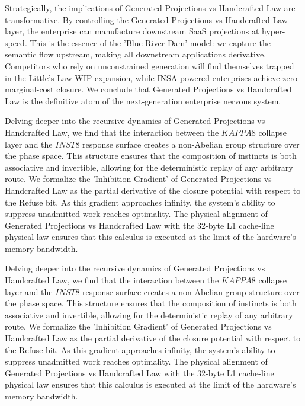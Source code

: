 \documentclass[12pt,a4paper,oneside]{book}
\begin{document}
Strategically, the implications of Generated Projections vs Handcrafted Law are transformative. By controlling the Generated Projections vs Handcrafted Law layer, the enterprise can manufacture downstream SaaS projections at hyper-speed. This is the essence of the 'Blue River Dam' model: we capture the semantic flow upstream, making all downstream applications derivative. Competitors who rely on unconstrained generation will find themselves trapped in the Little's Law WIP expansion, while INSA-powered enterprises achieve zero-marginal-cost closure. We conclude that Generated Projections vs Handcrafted Law is the definitive atom of the next-generation enterprise nervous system. 

Delving deeper into the recursive dynamics of Generated Projections vs Handcrafted Law, we find that the interaction between the $KAPPA8$ collapse layer and the $INST8$ response surface creates a non-Abelian group structure over the phase space. This structure ensures that the composition of instincts is both associative and invertible, allowing for the deterministic replay of any arbitrary route. We formalize the 'Inhibition Gradient' of Generated Projections vs Handcrafted Law as the partial derivative of the closure potential with respect to the Refuse bit. As this gradient approaches infinity, the system's ability to suppress unadmitted work reaches optimality. The physical alignment of Generated Projections vs Handcrafted Law with the 32-byte L1 cache-line physical law ensures that this calculus is executed at the limit of the hardware's memory bandwidth. 

Delving deeper into the recursive dynamics of Generated Projections vs Handcrafted Law, we find that the interaction between the $KAPPA8$ collapse layer and the $INST8$ response surface creates a non-Abelian group structure over the phase space. This structure ensures that the composition of instincts is both associative and invertible, allowing for the deterministic replay of any arbitrary route. We formalize the 'Inhibition Gradient' of Generated Projections vs Handcrafted Law as the partial derivative of the closure potential with respect to the Refuse bit. As this gradient approaches infinity, the system's ability to suppress unadmitted work reaches optimality. The physical alignment of Generated Projections vs Handcrafted Law with the 32-byte L1 cache-line physical law ensures that this calculus is executed at the limit of the hardware's memory bandwidth. 
\end{document}
